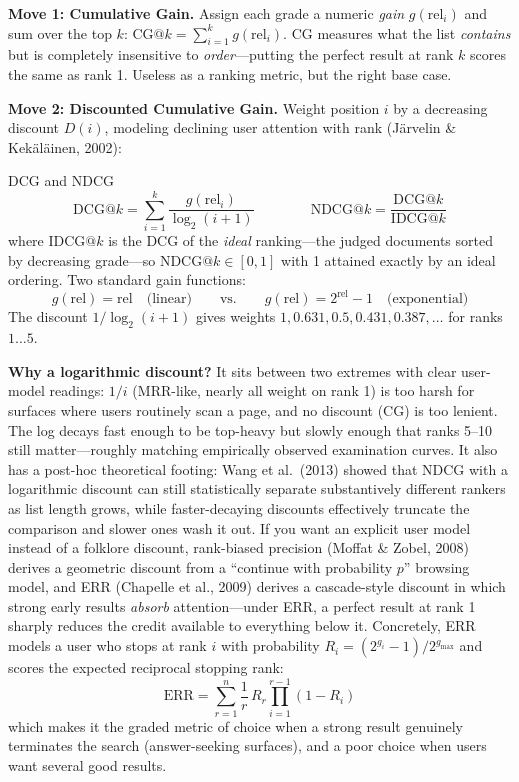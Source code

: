 \textbf{Move 1: Cumulative Gain.} Assign each grade a numeric \textit{gain} $g(\mathrm{rel}_i)$ and sum over the top $k$: $\mathrm{CG@}k = \sum_{i=1}^{k} g(\mathrm{rel}_i)$. CG measures what the list \textit{contains} but is completely insensitive to \textit{order}---putting the perfect result at rank $k$ scores the same as rank 1. Useless as a ranking metric, but the right base case.

\textbf{Move 2: Discounted Cumulative Gain.} Weight position $i$ by a decreasing discount $D(i)$, modeling declining user attention with rank (Järvelin \& Kekäläinen, 2002):

\begin{mathresult}{DCG and NDCG}
\begin{equation}
\mathrm{DCG@}k = \sum_{i=1}^{k} \frac{g(\mathrm{rel}_i)}{\log_2(i+1)}
\qquad\qquad
\mathrm{NDCG@}k = \frac{\mathrm{DCG@}k}{\mathrm{IDCG@}k}
\label{sr:eq:ndcg}
\end{equation}
where $\mathrm{IDCG@}k$ is the DCG of the \textit{ideal} ranking---the judged documents sorted by decreasing grade---so $\mathrm{NDCG@}k \in [0, 1]$ with 1 attained exactly by an ideal ordering. Two standard gain functions:
\begin{equation}
g(\mathrm{rel}) = \mathrm{rel} \quad \text{(linear)} \qquad \text{vs.} \qquad g(\mathrm{rel}) = 2^{\mathrm{rel}} - 1 \quad \text{(exponential)}
\end{equation}
The discount $1/\log_2(i+1)$ gives weights $1, 0.631, 0.5, 0.431, 0.387, \ldots$ for ranks $1\ldots 5$.
\end{mathresult}

\textbf{Why a logarithmic discount?} It sits between two extremes with clear user-model readings: $1/i$ (MRR-like, nearly all weight on rank 1) is too harsh for surfaces where users routinely scan a page, and no discount (CG) is too lenient. The log decays fast enough to be top-heavy but slowly enough that ranks 5--10 still matter---roughly matching empirically observed examination curves. It also has a post-hoc theoretical footing: Wang et al.\ (2013) showed that NDCG with a logarithmic discount can still statistically separate substantively different rankers as list length grows, while faster-decaying discounts effectively truncate the comparison and slower ones wash it out. If you want an explicit user model instead of a folklore discount, rank-biased precision (Moffat \& Zobel, 2008) derives a geometric discount from a ``continue with probability $p$'' browsing model, and ERR (Chapelle et al., 2009) derives a cascade-style discount in which strong early results \textit{absorb} attention---under ERR, a perfect result at rank 1 sharply reduces the credit available to everything below it. Concretely, ERR models a user who stops at rank $i$ with probability $R_i = (2^{g_i}-1)/2^{g_{\max}}$ and scores the expected reciprocal stopping rank:
\begin{equation}
\mathrm{ERR} = \sum_{r=1}^{n} \frac{1}{r}\, R_r \prod_{i=1}^{r-1} (1 - R_i)
\label{sr:eq:err}
\end{equation}
which makes it the graded metric of choice when a strong result genuinely terminates the search (answer-seeking surfaces), and a poor choice when users want several good results.

